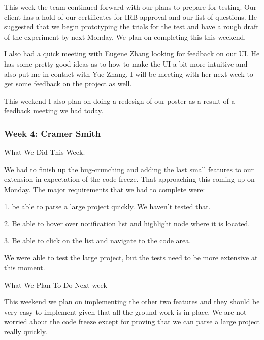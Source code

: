This week the team continued forward with our plans to prepare for testing. Our client has a hold of our certificates for IRB approval and our list of questions. He suggested that we begin prototyping the trials for the test and have a rough draft of the experiment by next Monday. We plan on completing this this weekend. 



I also had a quick meeting with Eugene Zhang looking for feedback on our UI. He has some pretty good ideas as to how to make the UI a bit more intuitive and also put me in contact with Yue Zhang. I will be meeting with her next week to get some feedback on the project as well.



This weekend I also plan on doing a redesign of our poster as a result of a feedback meeting we had today. \\ 

 \subsubsection{Week 4: Cramer Smith}

What We Did This Week.



We had to finish up the bug-crunching and adding the last small features to our extension in expectation of the code freeze. That approaching this coming up on Monday. The major requirements that we had to complete were:



1. be able to parse a large project quickly. We haven't tested that. 

2. Be able to hover over notification list and highlight node where it is located.

3. Be able to click on the list and navigate to the code area.



We were able to test the large project, but the tests need to be more extensive at this moment. 



What We Plan To Do Next week



This weekend we plan on implementing the other two features and they should be very easy to implement given that all the ground work is in place. We are not worried about the code freeze except for proving that we can parse a large project really quickly.  \\ 

